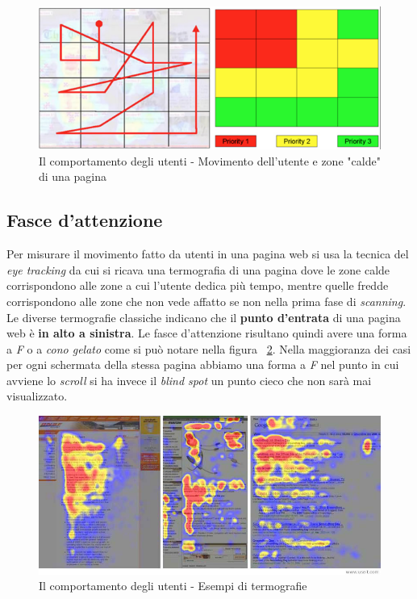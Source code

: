 		\begin{figure} [h]
				\centering
				\includegraphics[width=\textwidth]{images/IlComportamentoDegliUtenti-FasceDAttenzione2}
				\caption[Il comportamento degli utenti - Movimento utente e zone calde pagina]{Il comportamento degli utenti - Movimento dell'utente e zone "calde" di una pagina}
				\label{fig:FasceDAttenzione2}
		\end{figure}
		
		\subsection{Fasce d'attenzione}
		
			Per misurare il movimento fatto da utenti in una pagina web si usa la tecnica del \emph{eye tracking} da cui si ricava una termografia di una pagina dove le zone calde corrispondono alle zone a cui l'utente dedica più tempo, mentre quelle fredde corrispondono alle zone che non vede affatto se non nella prima fase di \emph{scanning}. Le diverse termografie classiche indicano che il \textbf{punto d'entrata} di una pagina web è \textbf{in alto a sinistra}. Le fasce d'attenzione risultano quindi avere una forma a \emph{F} o a \emph{cono gelato} come si può notare nella figura ~\ref{fig:FasceDAttenzione}.
			Nella maggioranza dei casi per ogni schermata della stessa pagina abbiamo una forma a \emph{F} nel punto in cui avviene lo \emph{scroll} si ha invece il \emph{blind spot} un punto cieco che non sarà mai visualizzato.
			
			\begin{figure} [h]
				\centering
				\includegraphics[trim={0 0 0 0}, width=\textwidth]{images/IlComportamentoDegliUtenti-FasceDAttenzione}
				\caption[Il comportamento degli utenti - Termografie]{Il comportamento degli utenti - Esempi di termografie}
				\label{fig:FasceDAttenzione}
			\end{figure}
		
